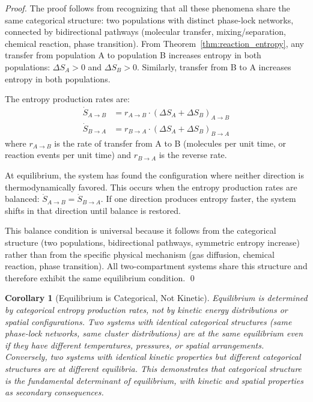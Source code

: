 \documentclass[12pt,a4paper]{article}
\newtheorem{corollary}[theorem]{Corollary}
\theoremstyle{definition}
\theoremstyle{remark}
\begin{document}
\begin{proof}
The proof follows from recognizing that all these phenomena share the same categorical structure: two populations with distinct phase-lock networks, connected by bidirectional pathways (molecular transfer, mixing/separation, chemical reaction, phase transition). From Theorem~\ref{thm:reaction_entropy}, any transfer from population A to population B increases entropy in both populations: $\Delta S_A > 0$ and $\Delta S_B > 0$. Similarly, transfer from B to A increases entropy in both populations.

The entropy production rates are:
\begin{align}
\dot{S}_{A \to B} &= r_{A \to B} \cdot (\Delta S_A + \Delta S_B)_{A \to B} \\
\dot{S}_{B \to A} &= r_{B \to A} \cdot (\Delta S_A + \Delta S_B)_{B \to A}
\end{align}
where $r_{A \to B}$ is the rate of transfer from A to B (molecules per unit time, or reaction events per unit time) and $r_{B \to A}$ is the reverse rate.

At equilibrium, the system has found the configuration where neither direction is thermodynamically favored. This occurs when the entropy production rates are balanced: $\dot{S}_{A \to B} = \dot{S}_{B \to A}$. If one direction produces entropy faster, the system shifts in that direction until balance is restored.

This balance condition is universal because it follows from the categorical structure (two populations, bidirectional pathways, symmetric entropy increase) rather than from the specific physical mechanism (gas diffusion, chemical reaction, phase transition). All two-compartment systems share this structure and therefore exhibit the same equilibrium condition. \qed
\end{proof}

\begin{corollary}[Equilibrium is Categorical, Not Kinetic]
\label{cor:equilibrium_categorical}
Equilibrium is determined by categorical entropy production rates, not by kinetic energy distributions or spatial configurations. Two systems with identical categorical structures (same phase-lock networks, same cluster distributions) are at the same equilibrium even if they have different temperatures, pressures, or spatial arrangements. Conversely, two systems with identical kinetic properties but different categorical structures are at different equilibria. This demonstrates that categorical structure is the fundamental determinant of equilibrium, with kinetic and spatial properties as secondary consequences.
\end{corollary}
\end{document}

